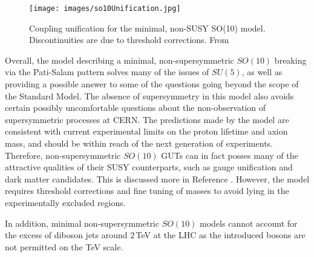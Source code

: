 \documentclass{article}
\begin{document}
\begin{figure}
    \centering
    \label{fig:so10Coupling}
    \texttt{[image: images/so10Unification.jpg]}
    \caption{Coupling unification for the minimal, non-SUSY SO(10) model. Discontinuities are due to threshold corrections. From \cite{SO10_1}}
\end{figure}

Overall, the model describing a minimal, non-supersymmetric $SO(10)$ breaking via the Pati-Salam pattern solves many of the issues of $SU(5)$, as well as providing a possible answer to some of the questions going beyond the scope of the Standard Model. The absence of supersymmetry in this model also avoids certain possibly uncomfortable questions about the non-observation of supersymmetric processes at CERN. The predictions made by the model are consistent with current experimental limits on the proton lifetime and axion mass, and should be within reach of the next generation of experiments. 
Therefore, non-supersymmetric $SO(10)$ GUTs can in fact posses many of the attractive qualities  of their SUSY counterparts, such as gauge unification and dark matter candidates. This is discussed more in Reference \cite{SO10_UnificationDM}.
However, the model requires threshold corrections and fine tuning of masses to avoid lying in the experimentally excluded regions. 


In addition, minimal non-supersymmetric $SO(10)$ models cannot account for the excess of diboson jets around $2\,$TeV at the LHC \cite{SO10_notDiboson} as the introduced bosons are not permitted on the TeV scale.
\end{document}
